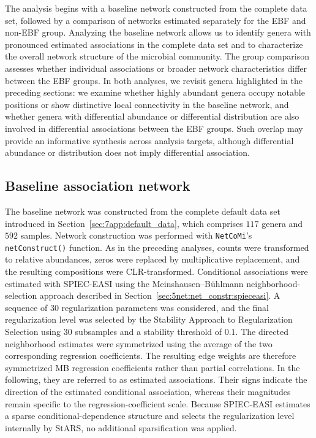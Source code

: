 The analysis begins with a baseline network constructed from the complete data set, followed by a comparison of networks estimated separately for the EBF and non-EBF group. Analyzing the baseline network allows us to identify genera with pronounced estimated associations in the complete data set and to characterize the overall network structure of the microbial community. The group comparison assesses whether individual associations or broader network characteristics differ between the EBF groups. In both analyses, we revisit genera highlighted in the preceding sections: we examine whether highly abundant genera occupy notable positions or show distinctive local connectivity in the baseline network, and whether genera with differential abundance or differential distribution are also involved in differential associations between the EBF groups. Such overlap may provide an informative synthesis across analysis targets, although differential abundance or distribution does not imply differential association.

\subsection{Baseline association network}
\label{sec:7app:network:baseline}

The baseline network was constructed from the complete default data set introduced in Section~\ref{sec:7app:default_data}, which comprises $117$ genera and $592$ samples. Network construction was performed with \texttt{NetCoMi}'s \texttt{netConstruct()} function. As in the preceding analyses, counts were transformed to relative abundances, zeros were replaced by multiplicative replacement, and the resulting compositions were CLR-transformed. Conditional associations were estimated with SPIEC-EASI using the Meinshausen--Bühlmann neighborhood-selection approach described in Section~\ref{sec:5net:net_constr:spieceasi}. A sequence of $30$ regularization parameters was considered, and the final regularization level was selected by the Stability Approach to Regularization Selection using $30$ subsamples and a stability threshold of $0.1$. The directed neighborhood estimates were symmetrized using the average of the two corresponding regression coefficients. The resulting edge weights are therefore symmetrized MB regression coefficients rather than partial correlations. In the following, they are referred to as estimated associations. Their signs indicate the direction of the estimated conditional association, whereas their magnitudes remain specific to the regression-coefficient scale. Because SPIEC-EASI estimates a sparse conditional-dependence structure and selects the regularization level internally by StARS, no additional sparsification was applied.

